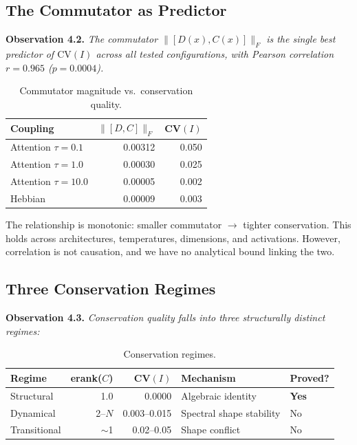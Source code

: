 \documentclass[11pt]{article}
\begin{document}
\subsection{The Commutator as Predictor}

\textbf{Observation 4.2.} \textit{The commutator $\|[D(x), C(x)]\|_F$ is the single best predictor of $\mathrm{CV}(I)$ across all tested configurations, with Pearson correlation $r = 0.965$ ($p = 0.0004$).}

\begin{table}[h]
  \centering
  \caption{Commutator magnitude vs.\ conservation quality.}
  \label{tab:commutator}
  \begin{tabular}{lrr}
    \toprule
    Coupling & $\|[D,C]\|_F$ & CV$(I)$ \\
    \midrule
    Attention $\tau=0.1$  & 0.00312 & 0.050 \\
    Attention $\tau=1.0$  & 0.00030 & 0.025 \\
    Attention $\tau=10.0$ & 0.00005 & 0.002 \\
    Hebbian               & 0.00009 & 0.003 \\
    \bottomrule
  \end{tabular}
\end{table}

The relationship is monotonic: smaller commutator $\to$ tighter conservation. This holds across architectures, temperatures, dimensions, and activations. However, correlation is not causation, and we have no analytical bound linking the two.

\subsection{Three Conservation Regimes}

\textbf{Observation 4.3.} \textit{Conservation quality falls into three structurally distinct regimes:}

\begin{table}[h]
  \centering
  \caption{Conservation regimes.}
  \label{tab:regimes}
  \begin{tabular}{lrrll}
    \toprule
    Regime & erank($C$) & CV$(I)$ & Mechanism & Proved? \\
    \midrule
    Structural    & 1.0       & 0.0000       & Algebraic identity       & \textbf{Yes} \\
    Dynamical     & 2--$N$    & 0.003--0.015 & Spectral shape stability & No \\
    Transitional  & $\sim$1   & 0.02--0.05   & Shape conflict           & No \\
    \bottomrule
  \end{tabular}
\end{table}
\end{document}

